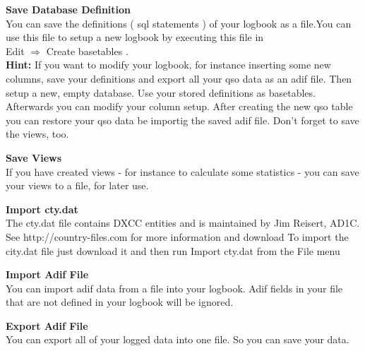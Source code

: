 \documentclass[a4paper,11pt]{article}
\begin{document}
\begin{flushleft}
\textbf{Save Database Definition}\\
You can save the definitions ( sql statements ) of your logbook as a file.You can
use this file to setup a new logbook by executing this file in\\
Edit $\Rightarrow$   Create basetables .\\
\textbf{Hint:} If you want to modify your logbook, for instance inserting some new
columns, save your definitions and export all your qso data as an adif file.
Then setup a new, empty database. Use your stored definitions as basetables.
Afterwards you can modify your column setup. After creating the new qso table
you can restore your qso data be importig the saved adif file. Don’t forget to
save the views, too.\linebreak

\textbf{Save Views}\\
If you have created views - for instance to calculate some statistics - you can
save your views to a file, for later use.\linebreak

\textbf{Import cty.dat}\\
The cty.dat file contains DXCC entities and is maintained by Jim Reisert, AD1C.
See http://country-files.com for more information and download
To import the city.dat file just download it and then run Import cty.dat from
the File menu\linebreak

\textbf{Import Adif File}\\
You can import adif data from a file into your logbook. Adif fields in your file
that are not defined in your logbook will be ignored.\linebreak

\textbf{Export Adif File}\\
You can export all of your logged data into one file. So you can save your data.\linebreak
\end{flushleft}
\end{document}
